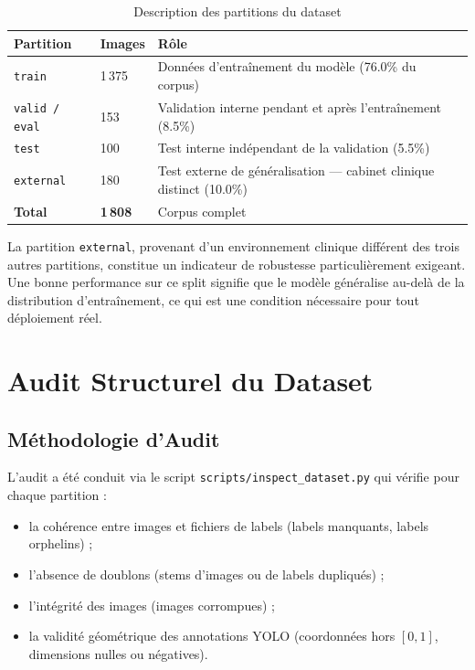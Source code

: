 \documentclass{rapportENSIAS}
\newcommand{\projectpath}[1]{\texttt{#1}}
\begin{document}
\begin{table}[H]
\centering
\caption{Description des partitions du dataset}
\label{tab:splits_description}
\begin{tabular}{p{2.5cm} p{2cm} p{9cm}}
\toprule
\textbf{Partition} & \textbf{Images} & \textbf{Rôle} \\
\midrule
\texttt{train}    & 1\,375 & Données d'entraînement du modèle (76.0\% du corpus) \\
\texttt{valid / eval} & 153 & Validation interne pendant et après l'entraînement (8.5\%) \\
\texttt{test}     & 100  & Test interne indépendant de la validation (5.5\%) \\
\texttt{external} & 180  & Test externe de généralisation — cabinet clinique distinct (10.0\%) \\
\midrule
\textbf{Total}    & \textbf{1\,808} & Corpus complet \\
\bottomrule
\end{tabular}
\end{table}

La partition \texttt{external}, provenant d'un environnement clinique différent
des trois autres partitions, constitue un indicateur de robustesse particulièrement
exigeant. Une bonne performance sur ce split signifie que le modèle généralise
au-delà de la distribution d'entraînement, ce qui est une condition nécessaire
pour tout déploiement réel.

\section{Audit Structurel du Dataset}

\subsection{Méthodologie d'Audit}

L'audit a été conduit via le script \projectpath{scripts/inspect\_dataset.py}
qui vérifie pour chaque partition :
\begin{itemize}
    \item la cohérence entre images et fichiers de labels (labels manquants, labels orphelins) ;
    \item l'absence de doublons (stems d'images ou de labels dupliqués) ;
    \item l'intégrité des images (images corrompues) ;
    \item la validité géométrique des annotations YOLO (coordonnées hors $[0,1]$,
          dimensions nulles ou négatives).
\end{itemize}
\end{document}
